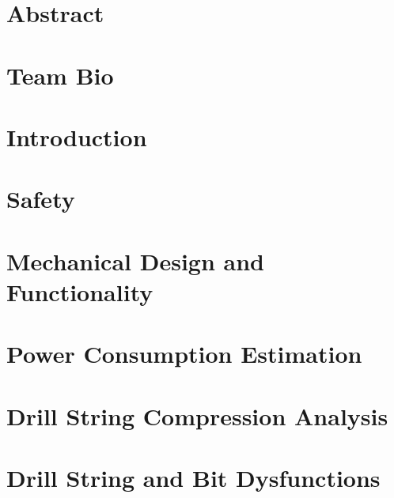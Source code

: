 \documentclass[a4paper,english,12pt]{article}
\begin{document}
\clearpage


\section*{Abstract}


\newpage

\section*{Team Bio}


\newpage

\tableofcontents

\newpage


\newpage
\section{Introduction}
\label{sec:1}


\newpage
\section{Safety}
\label{sec:2}


\newpage
\section{Mechanical Design and Functionality}
\label{sec:3}


\newpage
\section{Power Consumption Estimation}
\label{sec:4}


\newpage
\section{Drill String Compression Analysis}
\label{sec:5}



\newpage
\section{Drill String and Bit Dysfunctions}
\label{sec:6}

\end{document}
